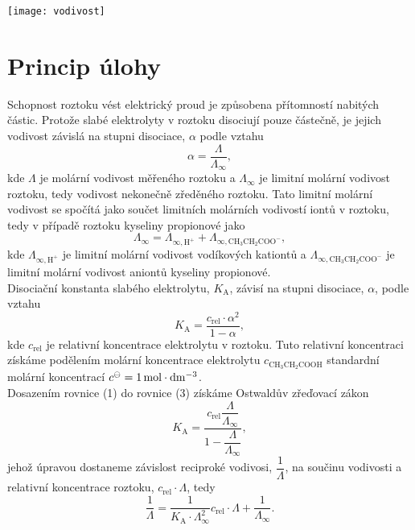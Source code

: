 \documentclass[12pt,a4paper]{article}
\def\ri#1{\mathrm{#1}}
\def\jd#1{\ifmmode\,\mathrm{#1}\else\,\textrm{#1}\fi}
\begin{document}
\begin{center}
\texttt{[image: vodivost]}
\end{center}
\section*{Princip úlohy}
Schopnost roztoku vést elektrický proud je způsobena přítomností nabitých částic. Protože slabé elektrolyty v roztoku disociují pouze částečně, je jejich vodivost závislá na stupni disociace, $\alpha$ podle vztahu
\begin{equation}
	\alpha = \dfrac{\Lambda}{\Lambda_\infty},
\end{equation}
kde $\Lambda$ je molární vodivost měřeného roztoku a $\Lambda_\infty$ je limitní molární vodivost roztoku, tedy vodivost nekonečně zředěného roztoku. Tato limitní molární vodivost se spočítá jako součet limitních molárních vodivostí iontů v roztoku, tedy v případě roztoku kyseliny propionové jako
\begin{equation}
	\Lambda_\infty = \Lambda_\ri{\infty, H^+} + \Lambda_\ri{\infty, CH_3CH_2COO^-},
\end{equation}
kde $\Lambda_\ri{\infty, H^+}$ je limitní molární vodivost vodíkových kationtů a $\Lambda_\ri{\infty, CH_3CH_2COO^-}$ je limitní molární vodivost aniontů kyseliny propionové.\\
Disociační konstanta slabého elektrolytu, $K_\ri{A}$, závisí na stupni disociace, $\alpha$, podle vztahu
\begin{equation}
	K_\ri{A} = \dfrac{c_\ri{rel}\cdot \alpha^2}{1-\alpha},
\end{equation}
kde $c_\ri{rel}$ je relativní koncentrace elektrolytu v roztoku. Tuto relativní koncentraci získáme podělením molární koncentrace elektrolytu $c_\ri{CH_3CH_2COOH}$ standardní molární koncentrací $c^\ominus = 1\jd{mol\cdot dm^{-3}}$.\\
Dosazením rovnice (1) do rovnice (3) získáme Ostwaldův zřeďovací zákon
\begin{equation}
	K_\ri{A} = \dfrac{c_\ri{rel}\dfrac{\Lambda}{\Lambda_\infty}}{1-\dfrac{\Lambda}{\Lambda_\infty}},
\end{equation}
jehož úpravou dostaneme závislost reciproké vodivosi, $\dfrac{1}{\Lambda}$, na součinu vodivosti a relativní koncentrace roztoku, $c_\ri{rel}\cdot \Lambda$, tedy
\begin{equation}
	\dfrac{1}{\Lambda} = \dfrac{1}{K_\ri{A}\cdot \Lambda_\infty^2} c_\ri{rel}\cdot \Lambda + \dfrac{1}{\Lambda_\infty}.
\end{equation}
\end{document}
